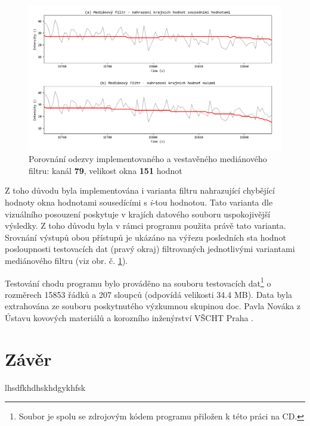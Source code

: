 \documentclass[a4paper, 12pt]{article}
\begin{document}
\begin{figure}[h!]
 \centering
 \includegraphics[width=\linewidth,height=0.65\linewidth]{median_diskuse.png}
 \caption{Porovnání odezvy implementovaného a vestavěného mediánového filtru: kanál \textbf{79}, velikost okna \textbf{151} hodnot}
 \label{fig:median_srovnani}
\end{figure}

\noindent Z toho důvodu byla implementována i varianta filtru nahrazující chybějící hodnoty okna hodnotami sousedícími s \textit{i}-tou hodnotou. Tato varianta dle vizuálního posouzení poskytuje v krajích datového souboru uspokojivější výsledky. Z toho důvodu byla v rámci programu použita právě tato varianta. Srovnání výstupů obou přístupů je ukázáno na výřezu posledních sta hodnot posloupnosti testovacích dat (pravý okraj) filtrovaných jednotlivými variantami mediánového filtru (viz obr. č. \ref{fig:median_srovnani}). \par

Testování chodu programu bylo prováděno na souboru testovacích dat\footnote{Soubor  je spolu se zdrojovým kódem programu přiložen k této práci na CD.} o rozměrech 15853 řádků a 207 sloupců (odpovídá velikosti 34.4 MB). Data byla extrahována ze souboru poskytnutého výzkumnou skupinou doc. Pavla Nováka z Ústavu kovových materiálů a korozního inženýrství VŠCHT Praha . 


\clearpage
\newpage
\section{Závěr}
lhsdfkhdhskhdgykhfsk

\clearpage
\newpage

\end{document}
